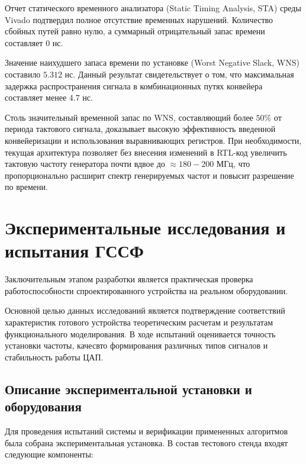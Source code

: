 \documentclass[12pt,a4paper,TimesNewRoman]{article}
\begin{document}
Отчет статического временного анализатора (Static Timing Analysis, STA) среды Vivado подтвердил полное отсутствие временных нарушений. Количество сбойных путей равно нулю, а суммарный отрицательный запас времени составляет $0$ нс.

Значение наихудшего запаса времени по установке (Worst Negative Slack, WNS) составило $5.312$ нс. Данный результат свидетельствует о том, что максимальная задержка распространения сигнала в комбинационных путях конвейера составляет менее $4.7$ нс. 

Столь значительный временной запас по WNS, составляющий более $50\%$ от периода тактового сигнала, доказывает высокую эффективность введенной конвейеризации и использования выравнивающих регистров. При необходимости, текущая архитектура позволяет без внесения изменений в RTL-код увеличить тактовую частоту генератора почти вдвое до $\approx 180-200$ МГц, что пропорционально расширит спектр генерируемых частот и повысит разрешение по времени.

\section{Экспериментальные исследования и испытания ГССФ}

Заключительным этапом разработки является практическая проверка работоспособности спроектированного устройства на реальном оборудовании. 

Основной целью данных исследований является подтверждение соответствий характеристик готового устройства теоретическим расчетам и результатам функционального моделирования. В ходе испытаний оценивается точность установки частоты, качесвто формирования различных типов сигналов и стабильность работы ЦАП.

\subsection{Описание экспериментальной установки и оборудования}

Для проведения испытаний системы и верификации примененных алгоритмов была собрана экспериментальная установка. В состав тестового стенда входят следующие компоненты:
\end{document}

